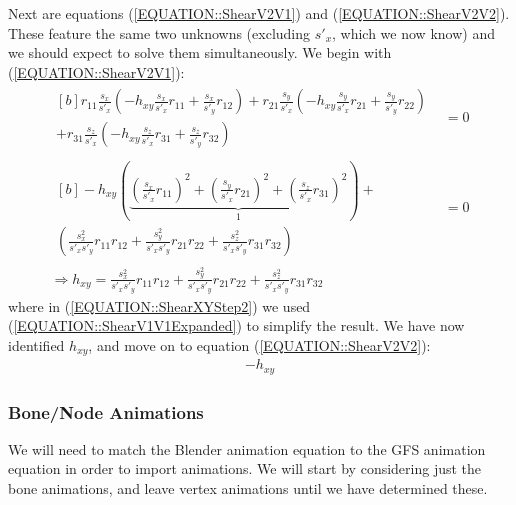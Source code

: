 \documentclass{article}
\begin{document}
Next are equations (\ref{EQUATION::ShearV2V1}) and (\ref{EQUATION::ShearV2V2}). These feature the same two unknowns (excluding $s'_x$, which we now know) and we should expect to solve them simultaneously. We begin with (\ref{EQUATION::ShearV2V1}):
\begin{align}
\begin{multlined}[b]
r_{11}\frac{s_x}{s'_x} \left( -h_{xy} \frac{s_x}{s'_x} r_{11} + \frac{s_x}{s'_y} r_{12} \right) 
+ r_{21}\frac{s_y}{s'_x} \left( -h_{xy} \frac{s_y}{s'_x} r_{21} + \frac{s_y}{s'_y} r_{22} \right) \\
+ r_{31}\frac{s_z}{s'_x} \left( -h_{xy} \frac{s_z}{s'_x} r_{31} + \frac{s_z}{s'_y} r_{32} \right)
\end{multlined} &= 0\\
\label{EQUATION::ShearXYStep2} \begin{multlined}[b]
-h_{xy} \left( \underbrace{ \left(\frac{s_x}{s'_x}r_{11}\right)^2 +  \left(\frac{s_y}{s'_x}r_{21}\right)^2 +  \left(\frac{s_z}{s'_x}r_{31}\right)^2 }_{1} \right) + \\
\left( \frac{s_x^2}{s'_x s'_y}r_{11}r_{12} + \frac{s_y^2}{s'_x s'_y}r_{21}r_{22} + \frac{s_z^2}{s'_x s'_y}r_{31}r_{32} \right)
\end{multlined} &= 0\\
\label{EQUATION::ShearXYResult} \Rightarrow h_{xy} =  \frac{s_x^2}{s'_x s'_y}r_{11}r_{12} + \frac{s_y^2}{s'_x s'_y}r_{21}r_{22} + \frac{s_z^2}{s'_x s'_y}r_{31}r_{32}
\end{align}
where in (\ref{EQUATION::ShearXYStep2}) we used (\ref{EQUATION::ShearV1V1Expanded}) to simplify the result. We have now identified $h_{xy}$, and move on to equation (\ref{EQUATION::ShearV2V2}):
\begin{align}
-h_{xy}
\end{align}

\clearpage
\subsubsection{Bone/Node Animations}
We will need to match the Blender animation equation to the GFS animation equation in order to import animations. We will start by considering just the bone animations, and leave vertex animations until we have determined these.
\end{document}
